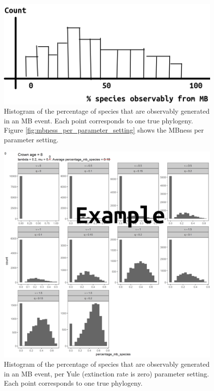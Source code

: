 \begin{figure}[!htbp]
  \includegraphics[width=\textwidth]{fig_mbness.png}
  \caption{
    Histogram of the percentage of species that are 
    observably generated in an MB event. 
    Each point corresponds to one true phylogeny.
    Figure \ref{fig:mbness_per_parameter_setting} 
    shows the MBness per parameter setting.
  }
  \label{fig:mbness}
\end{figure}

\begin{figure}[!htbp]
  \includegraphics[width=\textwidth]{p_mb_yule.png}
  \caption{
    Histogram of the percentage of species that are 
    observably generated in an MB event, per
    Yule (extinction rate is zero) parameter setting.
    Each point corresponds to one true phylogeny.
  }
  \label{fig:mbness_per_yule_parameter_setting}
\end{figure}

